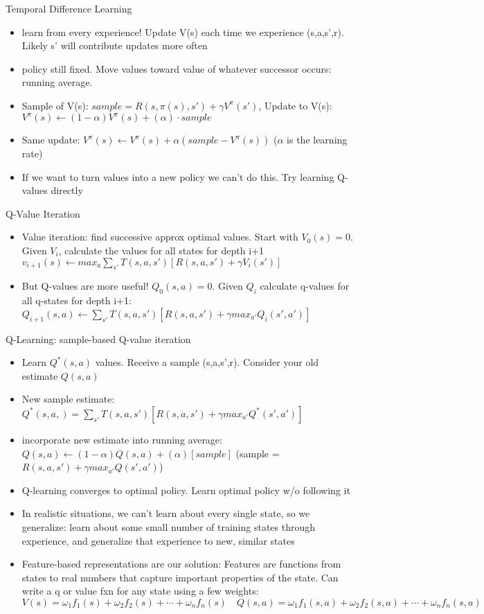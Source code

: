 \documentclass[10pt,twocolumn]{article}
\begin{document}
	Temporal Difference Learning
	\begin{itemize}
		\item learn from every experience! Update V(s) each time we experience (s,a,s',r). Likely s' will contribute updates more often
		\item policy still fixed. Move values toward value of whatever successor occurs: running average.
		\item Sample of V(s): $sample = R(s,\pi(s),s')+\gamma V^\pi(s')$, Update to V(s): $V^\pi(s)\leftarrow (1-\alpha)V^\pi(s)+(\alpha)\cdot sample$
		\item Same update: $V^\pi(s)\leftarrow V^\pi(s)+\alpha(sample-V^\pi(s))$ ($\alpha$ is the learning rate)
		\item If we want to turn values into a new policy we can't do this. Try learning Q-values directly
	\end{itemize}
	Q-Value Iteration
	\begin{itemize}
		\item Value iteration: find successive approx optimal values. Start with $V_0(s)=0$. Given $V_i$, calculate the values for all states for depth i+1 $v_{i+1}(s)\leftarrow max_a \displaystyle\sum_{s'}T(s,a,s')[R(s,a,s')+\gamma V_i(s')]$
		\item But Q-values are more useful! $Q_0(s,a)=0$. Given $Q_i$ calculate q-values for all q-states for depth i+1: $Q_{i+1}(s,a)\leftarrow \displaystyle\sum_{s'}T(s,a,s')[R(s,a,s')+\gamma max_{a'}Q_i(s',a')]$
	\end{itemize}
	Q-Learning: sample-based Q-value iteration
	\begin{itemize}
		\item Learn $Q^*(s,a)$ values. Receive a sample (s,a,s',r). Consider your old estimate $Q(s,a)$
		\item New sample estimate: $Q^*(s,a,)=\displaystyle\sum_{s'}T(s,a,s')[R(s,a,s')+\gamma max_{a'}Q^*(s',a')]$ 
		\item incorporate new estimate into running average: $Q(s,a)\leftarrow (1-\alpha)Q(s,a)+(\alpha)[sample]$ (sample = $R(s,a,s')+\gamma max_{a'}Q(s',a')$)
		\item Q-learning converges to optimal policy. Learn optimal policy w/o following it
		\item In realistic situations, we can't learn about every single state, so we generalize: learn about some small number of training states through experience, and generalize that experience to new, similar states
		\item Feature-based representations are our solution: Features are functions from states to real numbers that capture important properties of the state.
		Can write a q or value fxn for any state using a few weights: $V(s)=\omega_1f_1(s)+\omega_2f_2(s)+\cdots+\omega_nf_n(s) \quad Q(s,a) = \omega_1f_1(s,a)+\omega_2f_2(s,a)+\cdots+\omega_nf_n(s,a)$
		\end{itemize}
\end{document}
